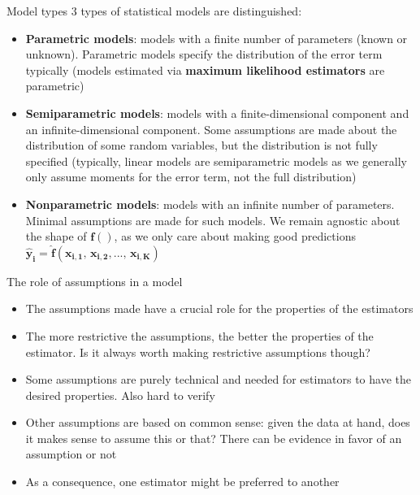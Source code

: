 \documentclass[
  ignorenonframetext,
  aspectratio=169]{beamer}
\providecommand{\tightlist}{%
  \setlength{\itemsep}{0pt}\setlength{\parskip}{0pt}}
\begin{document}
\begin{frame}{Model types}
\protect\hypertarget{model-types}{}
3 types of statistical models are distinguished:

\begin{itemize}
\tightlist
\item
  \textbf{Parametric models}: models with a finite number of parameters
  (known or unknown). Parametric models specify the distribution of the
  error term typically (models estimated via
  \textbf{maximum likelihood estimators} are parametric)
\item
  \textbf{Semiparametric models}: models with a finite-dimensional
  component and an infinite-dimensional component. Some assumptions are
  made about the distribution of some random variables, but the
  distribution is not fully specified (typically, linear models are
  semiparametric models as we generally only assume moments for the
  error term, not the full distribution)
\item
  \textbf{Nonparametric models}: models with an infinite number of
  parameters. Minimal assumptions are made for such models. We remain
  agnostic about the shape of \(\bm{f()}\), as we only care about making
  good predictions
  \(\bm{\hat{y}_i=\hat{f}(x_{i,1},\,x_{i,2},..., \, x_{i,K})}\)
\end{itemize}
\end{frame}

\begin{frame}{The role of assumptions in a model}
\protect\hypertarget{the-role-of-assumptions-in-a-model}{}
\begin{itemize}
\tightlist
\item
  The assumptions made have a crucial role for the properties of the
  estimators
\item
  The more restrictive the assumptions, the better the properties of the
  estimator. Is it always worth making restrictive assumptions though?
\item
  Some assumptions are purely technical and needed for estimators to
  have the desired properties. Also hard to verify
\item
  Other assumptions are based on common sense: given the data at hand,
  does it makes sense to assume this or that? There can be evidence in
  favor of an assumption or not
\item
  As a consequence, one estimator might be preferred to another
\end{itemize}
\end{frame}
\end{document}
